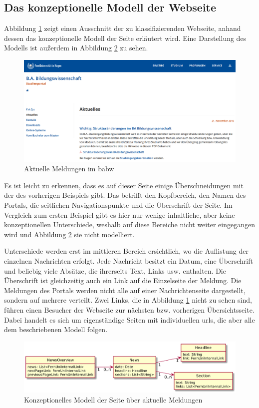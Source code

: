 \subsection{Das konzeptionelle Modell der Webseite}
    Abbildung \ref{image:findingNewsModelOverview} zeigt einen
    Ausschnitt der zu klassifizierenden Webseite,
    anhand dessen das konzeptionelle Modell der Seite erläutert wird.
    Eine Darstellung des Modells ist außerdem in Abbildung
    \ref{image:findingNewsModelUml} zu sehen.

    \begin{figure}[htb]
        \centering
        \includegraphics[width=\textwidth]{../resources/findings/case-study-2/news-overview.png}
        \caption{Aktuelle Meldungen im \gls{babw}}
        \label{image:findingNewsModelOverview}
    \end{figure}

    Es ist leicht zu erkennen, dass es auf dieser Seite einige Überschneidungen
    mit der des vorherigen Beispiels gibt.
    Das betrifft den Kopfbereich, den Namen des Portals,
    die seitlichen Navigationspunkte und die Überschrift der Seite.
    Im Vergleich zum ersten Beispiel gibt es hier nur wenige inhaltliche,
    aber keine konzeptionellen Unterschiede,
    weshalb auf diese Bereiche nicht weiter eingegangen wird und Abbildung
    \ref{image:findingNewsModelUml} sie nicht modelliert.

    Unterschiede werden erst im mittleren Bereich ersichtlich,
    wo die Auflistung der einzelnen Nachrichten erfolgt.
    Jede Nachricht besitzt ein Datum, eine Überschrift und beliebig viele Absätze,
    die ihrerseits Text, Links usw. enthalten.
    Die Überschrift ist gleichzeitig auch ein Link auf die Einzelseite der Meldung.
    Die Meldungen des Portals werden nicht alle auf einer Nachrichtenseite dargestellt,
    sondern auf mehrere verteilt.
    Zwei Links, die in Abbildung \ref{image:findingNewsModelOverview} nicht zu sehen sind,
    führen einen Besucher der Webseite zur nächsten bzw. vorherigen Übersichtsseite.
    Dabei handelt es sich um eigenständige Seiten mit individuellen \glspl{url},
    die aber alle dem beschriebenen Modell folgen.

    \begin{figure}[htb]
        \centering
        \includegraphics[scale=\imageScalingFactor]{../resources/findings/case-study-2/model.png}
        \caption{Konzeptionelles Modell der Seite über aktuelle Meldungen}
        \label{image:findingNewsModelUml}
    \end{figure}
